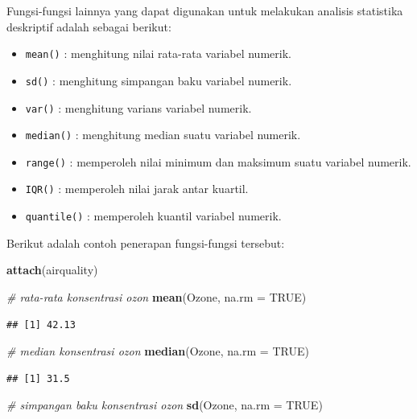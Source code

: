 \documentclass[]{book}
\newenvironment{Shaded}{\begin{snugshade}}{\end{snugshade}}
\newcommand{\CommentTok}[1]{\textcolor[rgb]{0.56,0.35,0.01}{\textit{#1}}}
\newcommand{\DataTypeTok}[1]{\textcolor[rgb]{0.13,0.29,0.53}{#1}}
\newcommand{\KeywordTok}[1]{\textcolor[rgb]{0.13,0.29,0.53}{\textbf{#1}}}
\newcommand{\NormalTok}[1]{#1}
\newcommand{\OtherTok}[1]{\textcolor[rgb]{0.56,0.35,0.01}{#1}}
\providecommand{\tightlist}{%
  \setlength{\itemsep}{0pt}\setlength{\parskip}{0pt}}
\theoremstyle{definition}
\theoremstyle{definition}
\theoremstyle{definition}
\theoremstyle{remark}
\begin{document}
Fungsi-fungsi lainnya yang dapat digunakan untuk melakukan analisis statistika deskriptif adalah sebagai berikut:

\begin{itemize}
\tightlist
\item
  \texttt{mean()} : menghitung nilai rata-rata variabel numerik.
\item
  \texttt{sd()} : menghitung simpangan baku variabel numerik.
\item
  \texttt{var()} : menghitung varians variabel numerik.
\item
  \texttt{median()} : menghitung median suatu variabel numerik.
\item
  \texttt{range()} : memperoleh nilai minimum dan maksimum suatu variabel numerik.
\item
  \texttt{IQR()} : memperoleh nilai jarak antar kuartil.
\item
  \texttt{quantile()} : memperoleh kuantil variabel numerik.
\end{itemize}

Berikut adalah contoh penerapan fungsi-fungsi tersebut:

\begin{Shaded}
\begin{Highlighting}[]
\KeywordTok{attach}\NormalTok{(airquality)}

\CommentTok{# rata-rata konsentrasi ozon}
\KeywordTok{mean}\NormalTok{(Ozone, }\DataTypeTok{na.rm =} \OtherTok{TRUE}\NormalTok{)}
\end{Highlighting}
\end{Shaded}

\begin{verbatim}
## [1] 42.13
\end{verbatim}

\begin{Shaded}
\begin{Highlighting}[]
\CommentTok{# median konsentrasi ozon}
\KeywordTok{median}\NormalTok{(Ozone, }\DataTypeTok{na.rm =} \OtherTok{TRUE}\NormalTok{)}
\end{Highlighting}
\end{Shaded}

\begin{verbatim}
## [1] 31.5
\end{verbatim}

\begin{Shaded}
\begin{Highlighting}[]
\CommentTok{# simpangan baku konsentrasi ozon}
\KeywordTok{sd}\NormalTok{(Ozone, }\DataTypeTok{na.rm =} \OtherTok{TRUE}\NormalTok{)}
\end{Highlighting}
\end{Shaded}
\end{document}
